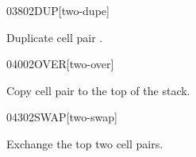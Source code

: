 \begin{worddef}{0380}{2DUP}[two-dupe]
\item {}

	Duplicate cell pair .

	\begin{testing} %
	\end{testing}
\end{worddef}


\begin{worddef}{0400}{2OVER}[two-over]
\item {}

	Copy cell pair  to the top of the stack.

	\begin{testing} %
	\end{testing}
\end{worddef}


\begin{worddef}{0430}{2SWAP}[two-swap]
\item {}

	Exchange the top two cell pairs.

	\begin{testing} %
	\end{testing}
\end{worddef}


